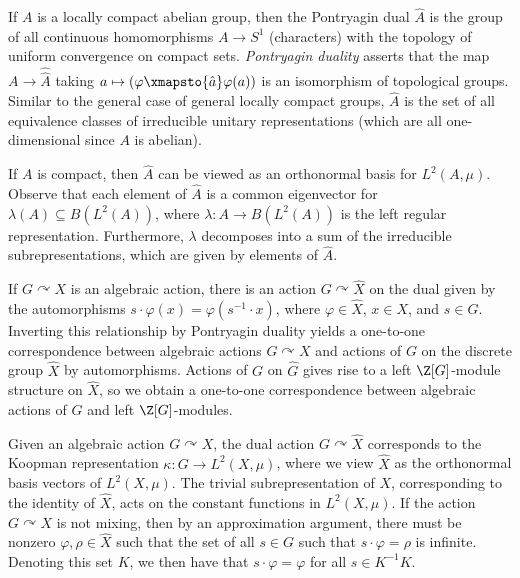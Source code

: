 \documentclass[10pt]{mypackage}
\begin{document}
If $A$ is a locally compact abelian group, then the Pontryagin dual $\widehat{A}$ is the group of all continuous homomorphisms $A\rightarrow S^1$ (characters) with the topology of uniform convergence on compact sets. \textit{Pontryagin duality} asserts that the map $A\rightarrow \widehat{\widehat{A}}$ taking $a\mapsto \left( \varphi\xmapsto{\hat{a}} \varphi(a) \right)$ is an isomorphism of topological groups. Similar to the general case of general locally compact groups, $\widehat{A}$ is the set of all equivalence classes of irreducible unitary representations (which are all one-dimensional since $A$ is abelian).

If $A$ is compact, then $\widehat{A}$ can be viewed as an orthonormal basis for $L^2\left( A,\mu \right)$. Observe that each element of $\widehat{A}$ is a common eigenvector for $\lambda(A)\subseteq B\left( L^2\left( A \right) \right)$, where $\lambda\colon A\rightarrow B\left( L^2\left( A \right) \right)$ is the left regular representation. Furthermore, $\lambda$ decomposes into a sum of the irreducible subrepresentations, which are given by elements of $\widehat{A}$.

If $G\curvearrowright X$ is an algebraic action, there is an action $G\curvearrowright \widehat{X}$ on the dual given by the automorphisms $s\cdot \varphi(x) = \varphi\left( s^{-1}\cdot x \right)$, where $\varphi\in \widehat{X}$, $x\in X$, and $s\in G$. Inverting this relationship by Pontryagin duality yields a one-to-one correspondence between algebraic actions $G\curvearrowright X$ and actions of $G$ on the discrete group $\widehat{X}$ by automorphisms. Actions of $G$ on $\widehat{G}$ gives rise to a left $\Z[G]$-module structure on $\widehat{X}$, so we obtain a one-to-one correspondence between algebraic actions of $G$ and left $\Z[G]$-modules.

Given an algebraic action $G\curvearrowright X$, the dual action $G\curvearrowright \widehat{X}$ corresponds to the Koopman representation $\kappa\colon G\rightarrow L^2\left( X,\mu \right)$, where we view $\widehat{X}$ as the orthonormal basis vectors of $L^2\left( X,\mu \right)$. The trivial subrepresentation of $X$, corresponding to the identity of $\widehat{X}$, acts on the constant functions in $L^2\left( X,\mu \right)$. If the action $G\curvearrowright X$ is not mixing, then by an approximation argument, there must be nonzero $\varphi,\rho\in \widehat{X}$ such that the set of all $s\in G$ such that $s\cdot \varphi = \rho$ is infinite. Denoting this set $K$, we then have that $s\cdot\varphi = \varphi$ for all $s\in K^{-1}K$.
\end{document}

